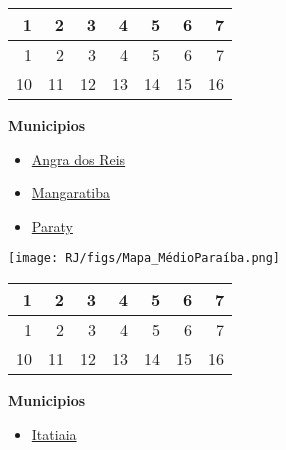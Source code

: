 \documentclass[10pt]{article} %
\begin{document}
\begin{minipage}[t]{.66\linewidth}
\begin{center}
\begin{tabular}{rrrrrrr}
  \hline
1 & 2 & 3 & 4 & 5 & 6 & 7 \\ 
  \hline
  1 &   2 &   3 &   4 &   5 &   6 &   7 \\ 
   10 &  11 &  12 &  13 &  14 &  15 &  16 \\ 
   \hline
\end{tabular}
\end{center}
\end{minipage}\hfill\begin{minipage}[t]{.30\linewidth}
\begin{mdframed}[style=sidebar,frametitle={}]
\textbf{Municipios}\begin{itemize}\item \hyperlink{https:/alerta.dengue.mat.br/alerta/3300100}{Angra dos Reis}
\item \hyperlink{https:/alerta.dengue.mat.br/alerta/3302601}{Mangaratiba}
\item \hyperlink{https:/alerta.dengue.mat.br/alerta/3303807}{Paraty}
\end{itemize}\end{mdframed}\hfill\end{minipage}\newpage\begin{minipage}[t]{.66\linewidth}
\hypertarget{ MéP }{}
\texttt{[image: RJ/figs/Mapa\_MédioParaíba.png]}\vspace{0.5cm}\begin{center}
\begin{tabular}{rrrrrrr}
  \hline
1 & 2 & 3 & 4 & 5 & 6 & 7 \\ 
  \hline
  1 &   2 &   3 &   4 &   5 &   6 &   7 \\ 
   10 &  11 &  12 &  13 &  14 &  15 &  16 \\ 
   \hline
\end{tabular}
\end{center}
\end{minipage}\hfill\begin{minipage}[t]{.30\linewidth}
\begin{mdframed}[style=sidebar,frametitle={}]
\textbf{Municipios}\begin{itemize}\item \hyperlink{https:/alerta.dengue.mat.br/alerta/3302254}{Itatiaia}

\end{itemize}
\end{mdframed}
\end{minipage}
\end{document}
